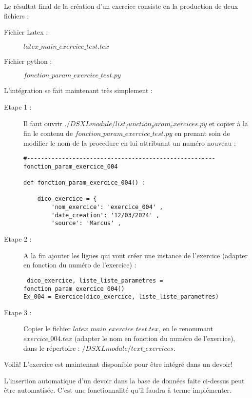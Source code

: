 Le résultat final de la création d'un exercice consiste en la production de deux fichiers : 

\begin{description}
 \item[Fichier Latex : ] $latex\_main\_exercice\_test.tex$
 \item[Fichier python : ] $fonction\_param\_exercice\_test.py$
\end{description}

L'intégration se fait maintenant très simplement : 

\begin{description}
 \item[Etape 1 : ] Il faut ouvrir $./DSXLmodule/list_function_param_exercices.py$ et copier à la fin le contenu de $fonction\_param\_exercice\_test.py$  en prenant soin de modifier le nom de la procedure en lui attribuant un numéro nouveau : 
 \begin{verbatim}
#------------------------------------------------------fonction_param_exercice_004

def fonction_param_exercice_004() : 

    dico_exercice = {
        'nom_exercice': 'exercice_004' ,
        'date_creation': '12/03/2024' ,
        'source': 'Marcus' ,
 \end{verbatim}
\item[Etape 2 : ]A la fin ajouter les lignes qui vont créer une instance de l'exercice (adapter en fonction du numéro de l'exercice) :

\begin{verbatim}
 dico_exercice, liste_liste_parametres = fonction_param_exercice_004()
Ex_004 = Exercice(dico_exercice, liste_liste_parametres)
\end{verbatim}

\item[Etape 3 : ] Copier le fichier $latex\_main\_exercice\_test.tex$, en le renommant $exercice\_004.tex$ (adapter le nom en fonction du numéro de l'exercice), dans le répertoire : $/DSXLmodule/text\_exercices$. 
\end{description}

Voilà! L'exercice est maintenant disponible pour être intégré dans un devoir!

\begin{todo} 
 L'insertion automatique d'un devoir dans la base de données faite ci-dessus peut être automatisée. C'est une fonctionnalité qu'il faudra à terme implémenter. 
\end{todo}
